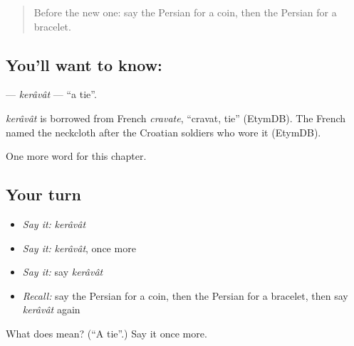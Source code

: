 \label{lesson:FA-C119-keravat}



\begin{quote}
Before the new one: say the Persian for a coin, then the Persian for a bracelet.
\end{quote}

\subsection*{You'll want to know: }
\textbf{} — \emph{kerâvât} — \textquotedblleft{}a tie\textquotedblright{}.

\begin{cousinweb}
\emph{kerâvât} is borrowed from French \emph{cravate}, \textquotedblleft{}cravat, tie\textquotedblright{} (EtymDB). The French named the neckcloth after the Croatian soldiers who wore it (EtymDB).
\end{cousinweb}

\begin{grammarlens}[title={What you've built}]
One more word for this chapter.
\end{grammarlens}

\subsection*{Your turn}
\begin{itemize}
\raggedright
  \item \emph{Say it:} \emph{kerâvât}
  \item \emph{Say it:} \emph{kerâvât}, once more
  \item \emph{Say it:} say \emph{kerâvât}
  \item \emph{Recall:} say the Persian for a coin, then the Persian for a bracelet, then say \emph{kerâvât} again
\end{itemize}

\begin{tcolorbox}[breakable,colback=teal!4,colframe=teal!35!black,title={Before you move on}]
What does  mean? (\textquotedblleft{}A tie\textquotedblright{}.) Say it once more.
\end{tcolorbox}
